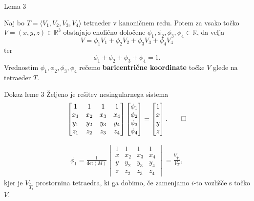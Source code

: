 \documentclass{beamer}
\begin{document}
\begin{frame}{Lema 3}
\begin{lemma}\label{lema_baricentricne}
    Naj bo $T = \langle V_1, V_2, V_3, V_4 \rangle$ tetraeder v kanoničnem redu.
    Potem za vsako točko $V = (x,y,z) \in \mathbb{R}^3$ obstajajo enolično določene
     $\phi_1, \phi_2, \phi_3, \phi_4 \in \mathbb{R}$,
    da velja 
    \begin{equation}\label{eq_baricentricne}
        V = \phi_1 V_1 + \phi_2 V_2 + \phi_3 V_3 + \phi_4 V_4
    \end{equation} ter 
    \begin{equation}\label{eq_particija}
        \phi_1 + \phi_2 + \phi_3 + \phi_4 = 1 .
    \end{equation}
    Vrednostim $\phi_1, \phi_2, \phi_3, \phi_4$ rečemo \textbf{baricentrične 
    koordinate} točke $V$ glede na tetraeder $T$.
\end{lemma}
\end{frame}

\begin{frame}{Dokaz leme 3}
    Željeno je rešitev nesingularnega sistema
    \begin{align*}
        \begin{bmatrix}
            1 & 1 & 1 & 1 \\
            x_1 & x_2 & x_3 & x_4 \\
            y_1 & y_2 & y_3 & y_4 \\
            z_1 & z_2 & z_3 & z_4
        \end{bmatrix} 
        \begin{bmatrix}\phi_1 \\ \phi_2 \\ \phi_3 \\ \phi_4 \end{bmatrix} = \begin{bmatrix}
            1 \\ x \\ y \\ z \end{bmatrix}.
        \qed
    \end{align*}

    \begin{align*}\label{eq_cramer}
        \phi_1 = \frac{1}{\text{det}(M)}
        \begin{vmatrix}
            1 & 1 & 1 & 1 \\
            x & x_2 & x_3 & x_4 \\
            y & y_2 & y_3 & y_4 \\
            z & z_2 & z_3 & z_4
        \end{vmatrix}
        = \frac{V_{\widetilde{T_1}}}{V_T},
    \end{align*}
    kjer je $V_{\widetilde{T_i}}$
    prostornina tetraedra, ki ga dobimo, če zamenjamo $i$-to vozlišče
    s točko $V$.
\end{frame}
\end{document}
